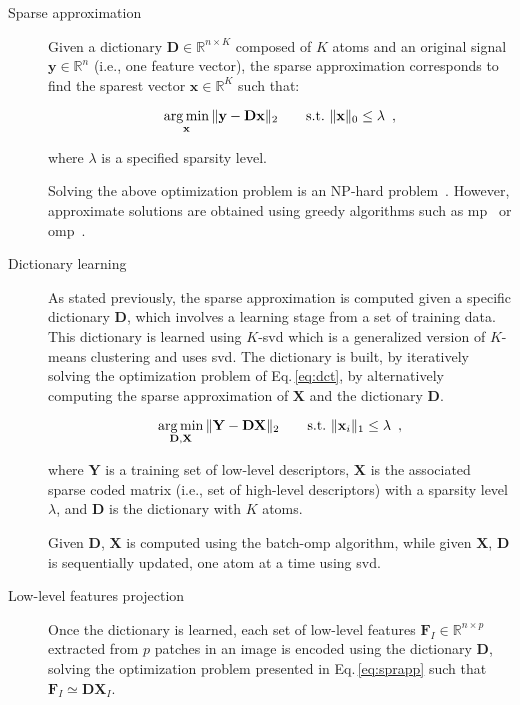 \begin{description}
\item[Sparse approximation] Given a dictionary $\mathbf{D} \in \mathbb{R}^{n \times K}$ composed of $K$ atoms and an original signal $\mathbf{y} \in \mathbb{R}^{n}$ (i.e., one feature vector), the sparse approximation corresponds to find the sparest vector $\mathbf{x} \in \mathbb{R}^{K}$ such that:

\begin{equation}
  \operatorname*{arg\,min}_{\mathbf{x}}\|\mathbf{y - Dx} \|_{2} \qquad  \text{s.t.} \  \|\mathbf{x}\|_{0} \leq \lambda \, \label{eq:sprapp} \ ,
\end{equation}

\noindent where $\lambda$ is a specified sparsity level.

Solving the above optimization problem is an NP-hard problem~\cite{elad2010sparse}.
However, approximate solutions are obtained using greedy algorithms such as \ac{mp}~\cite{mallat1993matching} or \ac{omp}~\cite{pati1993orthogonal,davis1997adaptive}.

\item[Dictionary learning] As stated previously, the sparse approximation is computed given a specific dictionary $\mathbf{D}$, which involves a learning stage from a set of training data.
This dictionary is learned using $K$-\acs*{svd} which is a generalized version of $K$-means clustering and uses \ac{svd}. 
The dictionary is built, by iteratively solving the optimization problem of Eq.\,\ref{eq:dct}, by alternatively computing the sparse approximation of $\mathbf{X}$ and the dictionary $\mathbf{D}$.

\begin{equation}
  \operatorname*{arg\,min}_{\mathbf{D,X}} \|\mathbf{Y} - \mathbf{D}\mathbf{X}\|_{2} \qquad  \text{s.t.} \  \|\mathbf{x}_{i}\|_{1} \leq \lambda \,\label{eq:dct} \ ,
\end{equation}

\noindent where $\mathbf{Y}$ is a training set of low-level descriptors, $\mathbf{X}$ is the associated sparse coded matrix (i.e., set of high-level descriptors) with a sparsity level $\lambda$, and $\mathbf{D}$ is the dictionary with $K$ atoms.

Given $\mathbf{D}$, $\mathbf{X}$ is computed using the batch-\ac{omp} algorithm, while given $\mathbf{X}$, $\mathbf{D}$ is sequentially updated, one atom at a time using \ac{svd}. 

\item[Low-level features projection] Once the dictionary is learned, each set of low-level features $\mathbf{F}_{I} \in \mathbb{R}^{n \times p}$ extracted from $p$ patches in an image is encoded using the dictionary $\mathbf{D}$, solving the optimization problem presented in Eq.\,\ref{eq:sprapp} such that $\mathbf{F}_{I} \simeq \mathbf{DX}_{I}$.


\end{description}
